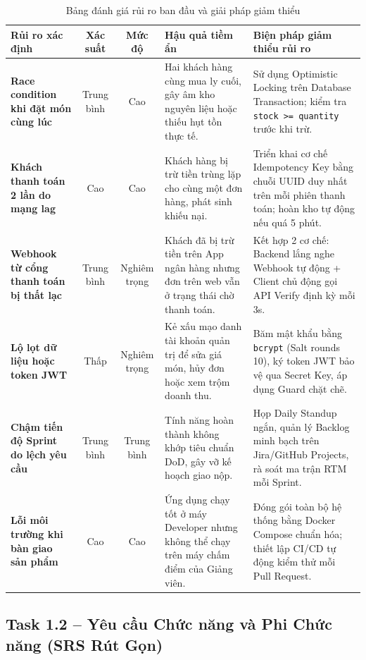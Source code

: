 \documentclass[11pt,a4paper]{article}
\begin{document}
\begin{table}[H]
\centering
\small
\renewcommand{\arraystretch}{0.92}
\begin{tabularx}{\linewidth}{|p{3.0cm}|c|c|p{4.2cm}|Y|}
\hline
{}
\textbf{Rủi ro xác định} & \textbf{Xác suất} & \textbf{Mức độ} & \textbf{Hậu quả tiềm ẩn} & \textbf{Biện pháp giảm thiểu rủi ro} \\ \hline
\textbf{Race condition khi đặt món cùng lúc} & Trung bình & Cao & Hai khách hàng cùng mua ly cuối, gây âm kho nguyên liệu hoặc thiếu hụt tồn thực tế. & Sử dụng Optimistic Locking trên Database Transaction; kiểm tra \texttt{stock >= quantity} trước khi trừ. \\ \hline
\textbf{Khách thanh toán 2 lần do mạng lag} & Cao & Cao & Khách hàng bị trừ tiền trùng lặp cho cùng một đơn hàng, phát sinh khiếu nại. & Triển khai cơ chế Idempotency Key bằng chuỗi UUID duy nhất trên mỗi phiên thanh toán; hoàn kho tự động nếu quá 5 phút. \\ \hline
\textbf{Webhook từ cổng thanh toán bị thất lạc} & Trung bình & Nghiêm trọng & Khách đã bị trừ tiền trên App ngân hàng nhưng đơn trên web vẫn ở trạng thái chờ thanh toán. & Kết hợp 2 cơ chế: Backend lắng nghe Webhook tự động + Client chủ động gọi API Verify định kỳ mỗi 3s. \\ \hline
\textbf{Lộ lọt dữ liệu hoặc token JWT} & Thấp & Nghiêm trọng & Kẻ xấu mạo danh tài khoản quản trị để sửa giá món, hủy đơn hoặc xem trộm doanh thu. & Băm mật khẩu bằng \texttt{bcrypt} (Salt rounds 10), ký token JWT bảo vệ qua Secret Key, áp dụng Guard chặt chẽ. \\ \hline
\textbf{Chậm tiến độ Sprint do lệch yêu cầu} & Trung bình & Trung bình & Tính năng hoàn thành không khớp tiêu chuẩn DoD, gây vỡ kế hoạch giao nộp. & Họp Daily Standup ngắn, quản lý Backlog minh bạch trên Jira/GitHub Projects, rà soát ma trận RTM mỗi Sprint. \\ \hline
\textbf{Lỗi môi trường khi bàn giao sản phẩm} & Cao & Cao & Ứng dụng chạy tốt ở máy Developer nhưng không thể chạy trên máy chấm điểm của Giảng viên. & Đóng gói toàn bộ hệ thống bằng Docker Compose chuẩn hóa; thiết lập CI/CD tự động kiểm thử mỗi Pull Request. \\ \hline
\end{tabularx}
\caption{Bảng đánh giá rủi ro ban đầu và giải pháp giảm thiểu}
\label{tab:risk}
\end{table}
\clearpage

\subsection{Task 1.2 -- Yêu cầu Chức năng và Phi Chức năng (SRS Rút Gọn)}
\end{document}
